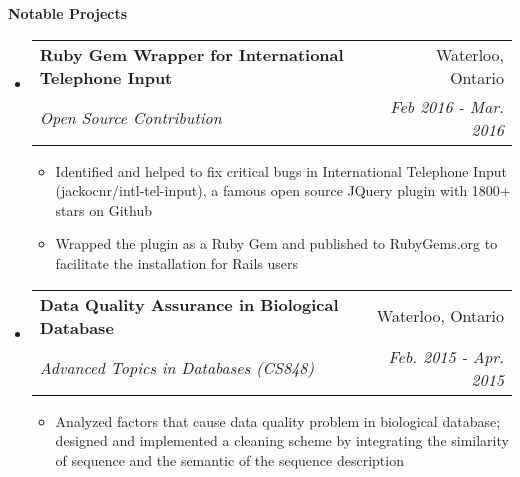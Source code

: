 \documentclass[letterpaper,10pt]{article}
\makeatletter
\newcommand{\resitem}[1]{\item #1 \vspace{-2pt}}
\newcommand{\resheading}[1]{{\large \colorbox{mygrey}{\begin{minipage}{\textwidth}{\textbf{#1 \vphantom{p\^{E}}}}\end{minipage}}}}
\newcommand{\ressubheading}[4]{
\begin{tabular*}{7.0in}{l@{\extracolsep{\fill}}r}
		\textbf{#1} & #2 \\
		\textit{#3} & \textit{#4} \\
\end{tabular*}\vspace{-6pt}}
\makeatother
\begin{document}
\resheading{Notable Projects}
\begin{itemize}
\itemsep0em
\item
    \ressubheading{Ruby Gem Wrapper for International Telephone Input}{Waterloo, Ontario}{Open Source Contribution}{Feb 2016 - Mar. 2016}
	\begin{itemize}
            \resitem{Identified and helped to fix critical bugs in International Telephone Input (jackocnr/intl-tel-input), a famous open source JQuery plugin with 1800+ stars on Github}
		\resitem{Wrapped the plugin as a Ruby Gem and published to RubyGems.org to facilitate the installation for Rails users}
	\end{itemize}
\item
	\ressubheading{Data Quality Assurance in Biological Database}{Waterloo, Ontario}{ Advanced Topics in Databases (CS848)}{ Feb. 2015 - Apr. 2015}
	\begin{itemize}
		\resitem{Analyzed factors that cause data quality problem in biological database; designed and implemented a cleaning scheme by integrating the similarity of sequence and the semantic of the sequence description}
	\end{itemize}
	
\end{itemize}
\end{document}
